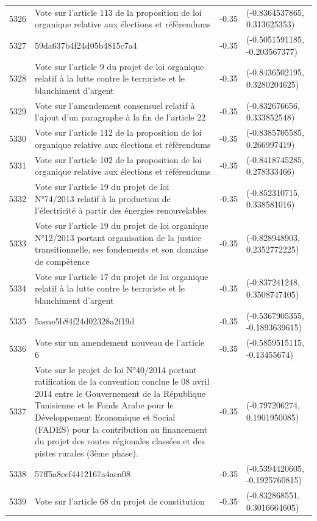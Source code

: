 \begin{table}[ht]
\begin{tabular}{rlrl}
  5326 & Vote sur l'article 113 de la proposition de loi organique relative aux élections et référendums & -0.35 & (-0.8364537865, 0.313625353) \\ 
  5327 & 59da637b4f24d05b4815c7a4 & -0.35 & (-0.5051591185, -0.203567377) \\ 
  5328 & Vote sur l'article 9 du projet de loi organique relatif à la lutte contre le terroriste et le blanchiment d'argent & -0.35 & (-0.8436502195, 0.3280204625) \\ 
  5329 & Vote sur l'amendement consensuel relatif à l'ajout d'un paragraphe à la fin de l'article 22 & -0.35 & (-0.832676656, 0.333852548) \\ 
  5330 & Vote sur l'article 112 de la proposition de loi organique relative aux élections et référendums & -0.35 & (-0.8385705585, 0.266997419) \\ 
  5331 & Vote sur l'article 102 de la proposition de loi organique relative aux élections et référendums & -0.35 & (-0.8418745285, 0.278333466) \\ 
  5332 & Vote sur l'article 19 du projet de loi N°74/2013 relatif à la production de l'électricité à partir des énergies renouvelables & -0.35 & (-0.852310715, 0.338581016) \\ 
  5333 & Vote sur l'article 19 du projet de loi organique N°12/2013 portant organisation de la justice transitionnelle, ses fondements et son domaine de compétence & -0.35 & (-0.828948903, 0.2352772225) \\ 
  5334 & Vote sur l'article 17 du projet de loi organique relatif à la lutte contre le terroriste et le blanchiment d'argent & -0.35 & (-0.837241248, 0.3508747405) \\ 
  5335 & 5aeae5b84f24d02328a2f19d & -0.35 & (-0.5367905355, -0.1893639615) \\ 
  5336 & Vote sur un amendement nouveau de l'article 6 & -0.35 & (-0.5859515115, -0.13455674) \\ 
  5337 & Vote sur le projet de loi N°40/2014 portant ratification de la convention conclue le 08 avril 2014 entre le Gouvernement de la République Tunisienne et le Fonds Arabe pour le Développement Economique et Social (FADES) pour la contribution au financement du projet des routes régionales classées et des pistes rurales (3ème phase). & -0.35 & (-0.797206274, 0.1901950085) \\ 
  5338 & 57ff5a8ecf4412167a4aea08 & -0.35 & (-0.5394420605, -0.1925760815) \\ 
  5339 & Vote sur l'article 68 du projet de constitution & -0.35 & (-0.832868551, 0.3016664605) \\ 

\end{tabular}
\end{table}
